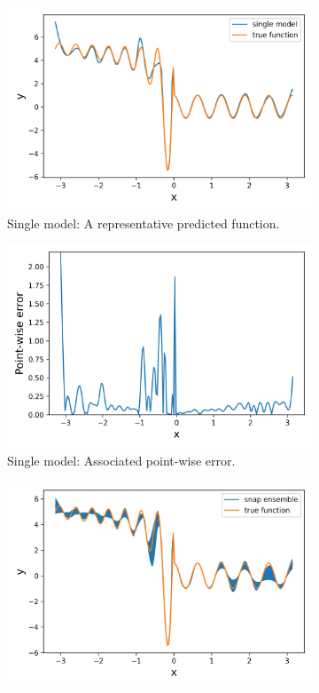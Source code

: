 \begin{figure}[H]
	\begin{subfigure}[b]{.45\textwidth}
		\centering
		\includegraphics[width=1\linewidth]{./figs/sm_rep_fun.png}  
		\caption{Single model: A representative predicted function.}
	\end{subfigure}
	\begin{subfigure}[b]{.45\textwidth}
		\centering
		\includegraphics[width=1\linewidth]{./figs/sm_rep_err.png}  
		\caption{Single model: Associated point-wise error.}
	\end{subfigure}
	\begin{subfigure}[b]{.45\textwidth}
		\centering
		\includegraphics[width=1\linewidth]{./figs/snap_rep_fun.png}  

\end{subfigure}
\end{figure}
